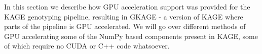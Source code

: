 In this section we describe how GPU acceleration support was provided for the KAGE genotyping pipeline, resulting in GKAGE - a version of KAGE where parts of the pipeline is GPU accelerated.
We will go over different methods of GPU accelerating some of the NumPy based components present in KAGE, some of which require no CUDA or C++ code whatsoever.


